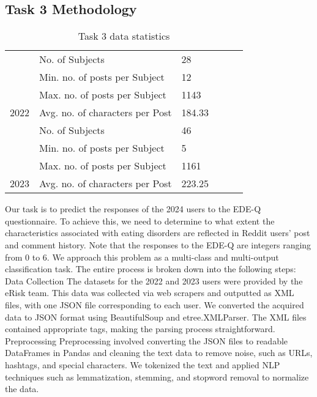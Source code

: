 \documentclass[]{style/ceurart}
\begin{document}
\subsection{Task 3 Methodology}


\begin{table}[]
\caption{Task 3 data statistics}
\begin{tabular}{|c|l|l|lll}
\cline{1-3}
                       & No. of Subjects                 & 28     &  &  &  \\ \cline{2-3}
                       & Min. no. of posts per Subject   & 12     &  &                               &  \\ \cline{2-3}
                       & Max. no. of posts per Subject   & 1143   &  &                               &  \\ \cline{2-3}
\multirow{-4}{*}{2022} & Avg. no. of characters per Post & 184.33 &  &                               &  \\ \cline{1-3}
                       & No. of Subjects                 & 46     &  &                               &  \\ \cline{2-3}
                       & Min. no. of posts per Subject   & 5      &  &                               &  \\ \cline{2-3}
                       & Max. no. of posts per Subject   & 1161   &  &                               &  \\ \cline{2-3}
\multirow{-4}{*}{2023} & Avg. no. of characters per Post & 223.25 &  &                               &  \\ \cline{1-3}
\end{tabular}
\end{table}


Our task is to predict the responses of the 2024 users to the EDE-Q questionnaire. To achieve this, we need to determine to what extent the characteristics associated with eating disorders are reflected in Reddit users' post and comment history. Note that the responses to the EDE-Q are integers ranging from 0 to 6. We approach this problem as a multi-class and multi-output classification task. The entire process is broken down into the following steps:
Data Collection
The datasets for the 2022 and 2023 users were provided by the eRisk team. This data was collected via web scrapers and outputted as XML files, with one JSON file corresponding to each user. We converted the acquired data to JSON format using BeautifulSoup and etree.XMLParser. The XML files contained appropriate tags, making the parsing process straightforward.
Preprocessing
Preprocessing involved converting the JSON files to readable DataFrames in Pandas and cleaning the text data to remove noise, such as URLs, hashtags, and special characters. We tokenized the text and applied NLP techniques such as lemmatization, stemming, and stopword removal to normalize the data.
\end{document}
